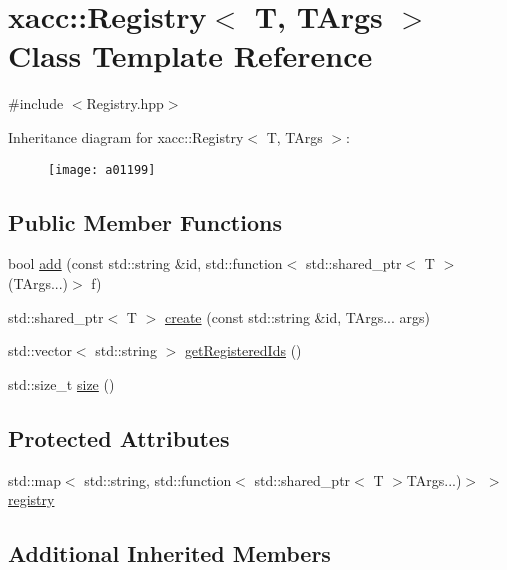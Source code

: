 \hypertarget{a01199}{}\section{xacc\+:\+:Registry$<$ T, T\+Args $>$ Class Template Reference}
\label{a01199}


{\ttfamily \#include $<$Registry.\+hpp$>$}

Inheritance diagram for xacc\+:\+:Registry$<$ T, T\+Args $>$\+:\begin{figure}[H]
\begin{center}
\leavevmode
\texttt{[image: a01199]}
\end{center}
\end{figure}
\subsection*{Public Member Functions}
\begin{DoxyCompactItemize}
\item 
bool \hyperlink{a01199_a9aa172c2603171db067b40bd62ba53c6}{add} (const std\+::string \&id, std\+::function$<$ std\+::shared\+\_\+ptr$<$ T $>$(T\+Args...)$>$ f)
\item 
std\+::shared\+\_\+ptr$<$ T $>$ \hyperlink{a01199_a3e71cc8d0effd065252608ee1ccdf207}{create} (const std\+::string \&id, T\+Args... args)
\item 
std\+::vector$<$ std\+::string $>$ \hyperlink{a01199_a8bff6f5c50534375abc4026662d69d2e}{get\+Registered\+Ids} ()
\item 
std\+::size\+\_\+t \hyperlink{a01199_a2352dd7c6c85ae5c5e232b577dfa2544}{size} ()
\end{DoxyCompactItemize}
\subsection*{Protected Attributes}
\begin{DoxyCompactItemize}
\item 
std\+::map$<$ std\+::string, std\+::function$<$ std\+::shared\+\_\+ptr$<$ T $>$T\+Args...)$>$ $>$ \hyperlink{a01199_a46460ecacc7facb6936b3c1ec6d618d7}{registry}
\end{DoxyCompactItemize}
\subsection*{Additional Inherited Members}


